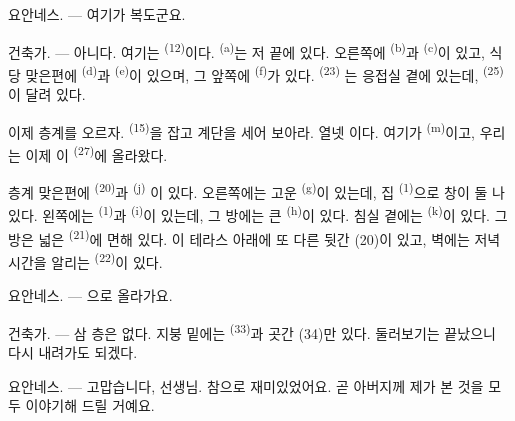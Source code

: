 \textsc{요안네스}. --- 여기가 복도군요.

\textsc{건축가}. --- 아니다. 여기는  \textsuperscript{(12)}이다.
 \textsuperscript{(a)}는 저 끝에 있다. 오른쪽에 
\textsuperscript{(b)}과  \textsuperscript{(c)}이 있고, 식당 맞은편에
 \textsuperscript{(d)}과  \textsuperscript{(e)}이 있으며, 그
앞쪽에  \textsuperscript{(f)}가 있다.  \textsuperscript{(23)}
는 응접실 곁에 있는데,  \textsuperscript{(25)}이 달려 있다.

이제 층계를 오르자.  \textsuperscript{(15)}을 잡고 계단을 세어 보아라. 열넷
이다. 여기가  \textsuperscript{(m)}이고, 우리는 이제 이 
\textsuperscript{(27)}에 올라왔다.

\VUsaut{3.0mm}
\VUsaut{3.0mm}

층계 맞은편에  \textsuperscript{(20)}과  \textsuperscript{(j)}
이 있다. 오른쪽에는 고운  \textsuperscript{(g)}이 있는데, 집 
\textsuperscript{(1)}으로 창이 둘 나 있다. 왼쪽에는  \textsuperscript{(1)}과
 \textsuperscript{(i)}이 있는데, 그 방에는 큰 
\textsuperscript{(h)}이 있다. 침실 곁에는  \textsuperscript{(k)}이 있다.
그 방은 넓은  \textsuperscript{(21)}에 면해 있다. 이 테라스 아래에 또
다른 뒷간 (20)이 있고, 벽에는 저녁 시간을 알리는  \textsuperscript{(22)}이
있다.

\textsc{요안네스}. --- 으로 올라가요.

\textsc{건축가}. --- 삼 층은 없다. 지붕 밑에는  \textsuperscript{(33)}과
곳간 (34)만 있다. 둘러보기는 끝났으니 다시 내려가도 되겠다.

\textsc{요안네스}. --- 고맙습니다, 선생님. 참으로 재미있었어요. 곧 아버지께 제가 본 것을
모두 이야기해 드릴 거예요.

\VUsaut{4.0mm}
\VUfilet{22mm}
